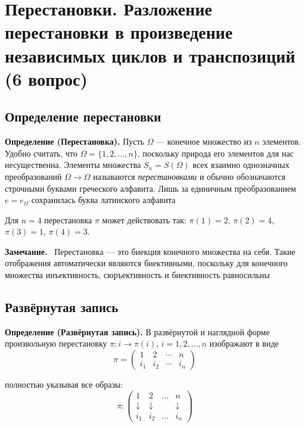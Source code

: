 \documentclass[a4paper,12pt]{article}
\newcommand{\myremark}{\textbf{Замечание.}\ }
\theoremstyle{definition}
\theoremstyle{plain}
\theoremstyle{remark}
\begin{document}
	
	
	
	
	
	\newpage
	\section{Перестановки. Разложение перестановки в произведение независимых циклов и транспозиций (6 вопрос)}
	
	\subsection{Определение перестановки}
	
	\noindent \textbf{Определение (Перестановка).}
	Пусть $\Omega$ — конечное множество из $n$ элементов. Удобно считать, что $\Omega = \{1, 2, \dots, n\}$, поскольку природа его элементов для нас несущественна. Элементы множества $S_n = S(\Omega)$ всех взаимно однозначных преобразований $\Omega \to \Omega$ называются \textit{перестановками} и обычно обозначаются строчными буквами греческого алфавита. Лишь за единичным преобразованием $e = e_\Omega$ сохранилась буква латинского алфавита
	
	\begin{tcolorbox}[colback=blue!5, colframe=blue!40!black, title=Пример перестановки]
		Для $n = 4$ перестановка $\pi$ может действовать так:
		$\pi(1) = 2$, $\pi(2) = 4$, $\pi(3) = 1$, $\pi(4) = 3$.
	\end{tcolorbox}
	
	\myremark
	Перестановка — это биекция конечного множества на себя. Такие отображения автоматически являются биективными, поскольку для конечного множества инъективность, сюръективность и биективность равносильны
	
	\subsection{Развёрнутая запись}
	
	\noindent \textbf{Определение (Развёрнутая запись).}
	В развёрнутой и наглядной форме произвольную перестановку $\pi \colon i \to \pi(i)$, $i = 1, 2, \dots, n$ изображают в виде
	\[
	\pi = \begin{pmatrix}
		1 & 2 & \cdots & n \\
		i_1 & i_2 & \cdots & i_n
	\end{pmatrix}
	\]
	
	полностью указывая все образы:
	\[
	\pi \colon \begin{pmatrix}
	1 & 2 & \dots & n \\
	\downarrow & \downarrow & & \downarrow \\
	i_1 & i_2 & \dots & i_n
	\end{pmatrix}
	\]
	
\end{document}

